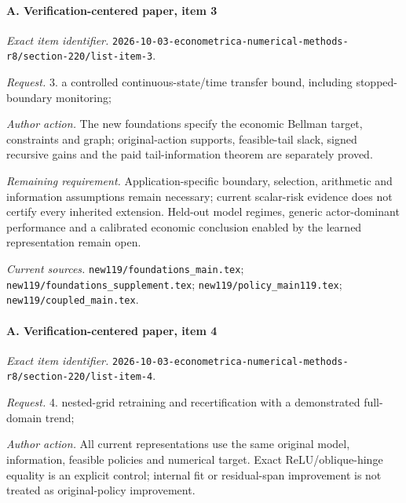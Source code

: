 \paragraph{A. Verification-centered paper, item 3}

\emph{Exact item identifier.} \nolinkurl{2026-10-03-econometrica-numerical-methods-r8/section-220/list-item-3}.

\par\emph{Request.} 3. a controlled continuous-state/\allowbreak{}time transfer bound, including stopped-boundary monitoring;

\par\emph{Author action.} The new foundations specify the economic Bellman target, constraints and graph; original-action supports, feasible-tail slack, signed recursive gains and the paid tail-information theorem are separately proved.

\par\emph{Remaining requirement.} Application-specific boundary, selection, arithmetic and information assumptions remain necessary; current scalar-risk evidence does not certify every inherited extension. Held-out model regimes, generic actor-dominant performance and a calibrated economic conclusion enabled by the learned representation remain open.

\par\emph{Current sources.} \nolinkurl{new119/foundations_main.tex}; \nolinkurl{new119/foundations_supplement.tex}; \nolinkurl{new119/policy_main119.tex}; \nolinkurl{new119/coupled_main.tex}.

\paragraph{A. Verification-centered paper, item 4}

\emph{Exact item identifier.} \nolinkurl{2026-10-03-econometrica-numerical-methods-r8/section-220/list-item-4}.

\par\emph{Request.} 4. nested-grid retraining and recertification with a demonstrated full-domain trend;

\par\emph{Author action.} All current representations use the same original model, information, feasible policies and numerical target. Exact ReLU/\allowbreak{}oblique-hinge equality is an explicit control; internal fit or residual-span improvement is not treated as original-policy improvement.

